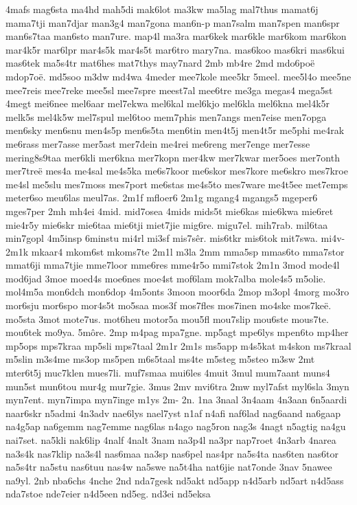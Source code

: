 {4mafs
mag6sta
ma4hd
mah5di
mak6lot
ma3kw
ma5lag
mal7thus
mamat6j
mama7tji
man7djar
man3g4
man7gona
man6n-p
man7salm
man7spen
man6spr
man6s7taa
man6sto
man7ure.
map4l
ma3ra
mar6kek
mar6kle
mar6kom
mar6kon
mar4k5r
mar6lpr
mar4s5k
mar4s5t
mar6tro
mary7na.
mas6koo
mas6kri
mas6kui
mas6tek
ma5s4tr
mat6hes
mat7thys
may7nard
2mb
mb4re
2md
mdo6poë
mdop7oë.
md5soo
m3dw
md4wa
4meder
mee7kole
mee5kr
5meel.
mee5l4o
mee5ne
mee7reis
mee7reke
mee5sl
mee7spre
meest7al
mee6tre
me3ga
megas4
mega5st
4megt
mei6nee
mel6aar
mel7ekwa
mel6kal
mel6kjo
mel6kla
mel6kna
mel4k5r
melk5s
mel4k5w
mel7spul
mel6too
mem7phis
men7angs
men7eise
men7opga
men6sky
men6snu
men4s5p
men6s5ta
men6tin
men4t5j
men4t5r
me5phi
me4rak
me6rass
mer7asse
mer5ast
mer7dein
me4rei
me6reng
mer7enge
mer7esse
mering8s9taa
mer6kli
mer6kna
mer7kopn
mer4kw
mer7kwar
mer5oes
mer7onth
mer7treë
mes4a
me4sal
me4s5ka
me6s7koor
me6skor
mes7kore
me6skro
mes7kroe
me4sl
me5slu
mes7moss
mes7port
me6stas
me4s5to
mes7ware
me4t5ee
met7emps
meter6so
meu6las
meul7as.
2m1f
mfloer6
2m1g
mgang4
mgangs5
mgeper6
mges7per
2mh
mh4ei
4mid.
mid7osea
4mids
mids5t
mie6kas
mie6kwa
mie6ret
mie4r5y
mie6skr
mie6taa
mie6tji
miet7jie
mig6re.
migu7el.
mih7rab.
mil6taa
min7gopl
4m5insp
6minstu
mi4rl
mi3sf
mis7sêr.
mis6tkr
mis6tok
mit7swa.
mi4v-
2m1k
mkaar4
mkom6st
mkoms7te
2m1l
m3la
2mm
mma5sp
mmas6to
mma7stor
mmat6ji
mma7tjie
mme7loor
mme6res
mme4r5o
mmi7stok
2m1n
3mod
mode4l
mod6jad
3moe
moed4s
moe6nes
moe4st
mof6lam
mok7alba
mole4s5
m5olie.
mol4m5a
mon6dch
mon6dop
4m5onts
3moon
moor6da
2mop
m3opl
4morg
mo3ro
mor6sju
mor6spo
mor4s5t
mo5saa
mos3f
mos7fles
mos7inen
mo4ske
mos7keë.
mo5sta
3mot
mote7us.
mot6heu
motor5a
mou5fl
mou7slip
mou6ste
mous7te.
mou6tek
mo9ya.
5môre.
2mp
m4pag
mpa7gne.
mp5agt
mpe6lys
mpen6to
mp4her
mp5ops
mps7kraa
mp5sli
mps7taal
2m1r
2m1s
ms5app
m4s5kat
m4skon
ms7kraal
m5slin
m3s4me
ms3op
ms5pen
m6s5taal
ms4te
m5steg
m5steo
m3sw
2mt
mter6t5j
muc7klen
mues7li.
muf7smaa
mui6les
4muit
3mul
mum7aant
muns4
mun5st
mun6tou
mur4g
mur7gie.
3mus
2mv
mvi6tra
2mw
myl7afst
myl6sla
3myn
myn7ent.
myn7impa
myn7inge
m1ys
2m-
2n.
1na
3naal
3n4aam
4n3aan
6n5aardi
naar6skr
n5admi
4n3adv
nae6lys
nael7yst
n1af
n4afi
naf6lad
nag6aand
na6gaap
na4g5ap
na6gemm
nag7emme
nag6las
n4ago
nag5ron
nag3s
4nagt
n5agtig
na4gu
nai7set.
na5kli
nak6lip
4nalf
4nalt
3nam
na3p4l
na3pr
nap7roet
4n3arb
4narea
na3s4k
nas7klip
na3s4l
nas6maa
na3sp
nas6pel
nas4pr
na5s4ta
nas6ten
nas6tor
na5s4tr
na5stu
nas6tuu
nas4w
na5swe
na5t4ha
nat6jie
nat7onde
3nav
5nawee
na9yl.
2nb
nba6chs
4nche
2nd
nda7gesk
nd5akt
nd5app
n4d5arb
nd5art
n4d5ass
nda7stoe
nde7eier
n4d5een
nd5eg.
nd3ei
nd5eksa
}
